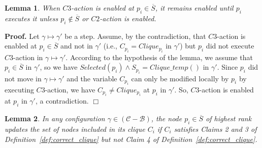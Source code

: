 \documentclass[11pt,letterpaper,onecolumn]{article}
\newtheorem{lemma}{Lemma}
\newenvironment{proof}{\noindent \begin{rm}{\textbf{Proof.} }}{\hspace*{\fill}$\Box$\par\end{rm} \vspace{.3cm}}
\begin{document}
\begin{lemma}
\label{lem:C3-action}
When $C3$-action is enabled at $p_i \in \overline{S}$, it remains enabled until $p_i$ executes it unless $p_i \not \in \overline{S}$ or $C2$-action is enabled.
\end{lemma}

\begin{proof}
Let $\gamma \mapsto \gamma'$ be a step. Assume, by the contradiction, that $C3$-action is enabled at $p_i \in \overline{S}$ and not in $\gamma'$ (i.e., $C_{p_i}=Clique_{p_i}$ in $\gamma'$) but $p_i$ did not execute $C3$-action in $\gamma \mapsto \gamma'$. According to the hypothesis of the lemma, we assume that $p_i \in \overline{S}$ in $\gamma'$, so we have $Selected(p_i) \wedge S_{p_i}=Clique\_temp()$ in $\gamma'$. Since $p_i$ did not move in $\gamma \mapsto \gamma'$ and the variable $C_{p_i}$ can only be modified locally by $p_i$ by executing $C3$-action, we have $C_{p_i} \neq Clique_{p_i}$ at $p_i$ in $\gamma'$. So, $C3$-action is enabled at $p_i$ in $\gamma'$, a contradiction.
\end{proof}

\begin{lemma}
\label{lem:update_clique}
In any configuration $\gamma \in (\mathcal{C}-\mathcal{B})$, the node $p_i \in \overline{S}$ of highest rank updates the set of nodes included in its clique $C_i$ if $C_i$ satisfies Claims 2 and 3 of Definition~\ref{def:correct_clique} but not Claim 4 of Definition~\ref{def:correct_clique}.
\end{lemma}
\end{document}
